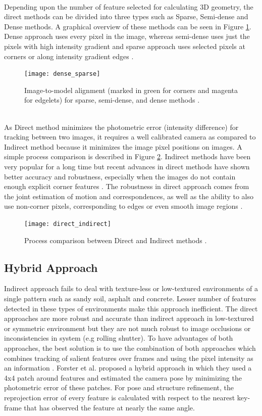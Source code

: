 \\ 
Depending upon the number of feature selected for calculating 3D geometry, the direct methods can be divided into three types such as Sparse, Semi-dense and Dense methods. A graphical overview of these methods can be seen in Figure \ref{fig:dense_sparse}. Dense approach uses every pixel in the image, whereas semi-dense uses just the pixels with high intensity gradient and sparse approach uses selected pixels at corners or along intensity gradient edges \cite{engel14eccv}.
\newline
\begin{figure}[h]
	\centering
	\texttt{[image: dense\_sparse]}
	\caption{Image-to-model alignment (marked in green for corners and magenta for
		edgelets) for sparse, semi-dense, and dense methods \cite{7782863}.}
	\label{fig:dense_sparse}
\end{figure}
\\
As Direct method minimizes the photometric error (intensity difference) for tracking between two images, it requires a well calibrated camera as compared to Indirect method because it minimizes the image pixel positions on images. A simple process comparison is described in Figure \ref{fig:direct_indirect}. Indirect methods have been very popular for a long time but recent advances in direct methods have shown better accuracy and robustness, especially when the images do not contain enough explicit corner features \cite{Engel-et-al-pami2018}. The robustness in direct approach comes from the joint estimation of motion and correspondences, as well as the ability to also use non-corner pixels, corresponding to edges or even smooth image regions \cite{gao2018ldso}.
\begin{figure}[h]
	\centering
	\texttt{[image: direct\_indirect]}
	\caption{Process comparison between Direct and Indirect methods \cite{engel14eccv}.}
	\label{fig:direct_indirect}
\end{figure}
\subsection{Hybrid Approach}
Indirect approach fails to deal with texture-less or low-textured environments of a single pattern such as sandy soil, asphalt and concrete. Lesser number of features detected in these types of environments make this approach inefficient. The direct approaches are more robust and accurate than indirect approach in low-textured or symmetric environment but they are not much robust to image occlusions or inconsistencies in system (e.g rolling shutter). To have advantages of both approaches, the best solution is to use the combination of both approaches which combines tracking of salient features over frames and using the pixel intensity as an information \cite{Aqel-et-al-2016}. Forster et al. \cite{7782863} proposed a hybrid approach in which they used a 4x4 patch around features and estimated the camera pose by minimizing the photometric error of these patches. For pose and structure refinement, the reprojection error of every feature is calculated with respect to the nearest key-frame that has observed the feature at nearly the same angle.


